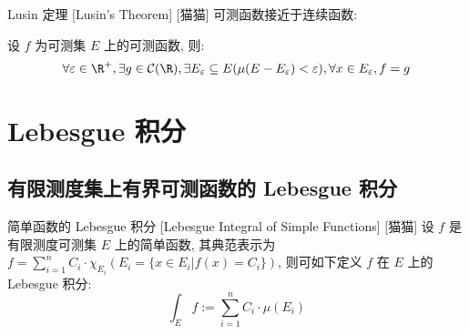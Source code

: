 \documentclass[UTF8]{ctexart}
\begin{document}
            \begin{thm}
                {Lusin 定理}
                [Lusin's Theorem]
                [猫猫]
                可测函数接近于连续函数: 
                
                设 \(f\) 为可测集 \(E\) 上的可测函数, 则: 
                \[\forall\varepsilon\in\R^+, \exists g\in\mathcal{C}(\R), \exists E_\varepsilon\subseteq E(\mu(E-E_\varepsilon)<\varepsilon), \forall x\in E_\varepsilon, f=g\]
            \end{thm}

    \section{Lebesgue 积分} %

        \subsection{有限测度集上有界可测函数的 Lebesgue 积分}
            
            \begin{dfn}
                {简单函数的 Lebesgue 积分}
                [Lebesgue Integral of Simple Functions]
                [猫猫]
                设 \(f\) 是有限测度可测集 \(E\) 上的简单函数, 其典范表示为 \(f=\sum\limits_{i=1}^{n}C_i\cdot\chi_{E_i}(E_i=\{x\in E_i|f(x)=C_i\})\), 则可如下定义 \(f\) 在 \(E\) 上的 Lebesgue 积分: 
                \[\int_E f:=\sum_{i=1}^n C_i\cdot\mu(E_i)\]
            \end{dfn}
\end{document}
